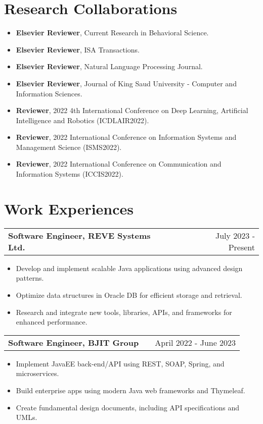 \documentclass[a4paper, 12pt]{article}
\makeatletter
\newenvironment{joblong}[2]{
\begin{tabularx}
	{\linewidth}{@{}l X r@{}} \textbf{#1} & \hfill & #2 \\[3.75pt]
\end{tabularx}
\begin{minipage}[t]{\linewidth} \begin{itemize}[nosep,after=\strut, leftmargin=1em,
itemsep=3pt,label=\textbullet] }{ \end{itemize} \end{minipage} }
\makeatother
\begin{document}
	\section{\textbf{Research Collaborations}}

	\begin{itemize}[leftmargin=*,itemsep=2pt,parsep=0pt]
		\item \textbf{Elsevier Reviewer}, Current Research in Behavioral Science.

		\item \textbf{Elsevier Reviewer}, ISA Transactions.

		\item \textbf{Elsevier Reviewer}, Natural Language Processing Journal.

		\item \textbf{Elsevier Reviewer}, Journal of King Saud University - Computer
			and Information Sciences.

		\item \textbf{Reviewer}, 2022 4th International Conference on Deep Learning,
			Artificial Intelligence and Robotics (ICDLAIR2022).

		\item \textbf{Reviewer}, 2022 International Conference on Information Systems
			and Management Science (ISMS2022).

		\item \textbf{Reviewer}, 2022 International Conference on Communication and Information
			Systems (ICCIS2022).
	\end{itemize}

	\section{\textbf{Work Experiences}}

	\begin{joblong}
		{Software Engineer, REVE Systems Ltd.}{July 2023 - Present} \item Develop
		and implement scalable Java applications using advanced design patterns. \item
		Optimize data structures in Oracle DB for efficient storage and retrieval.
		\item Research and integrate new tools, libraries, APIs, and frameworks for enhanced
		performance.
	\end{joblong}

	\begin{joblong}
		{Software Engineer, BJIT Group}{April 2022 - June 2023} \item Implement
		JavaEE back-end/API using REST, SOAP, Spring, and microservices. \item Build
		enterprise apps using modern Java web frameworks and Thymeleaf. \item Create
		fundamental design documents, including API specifications and UMLs.
	\end{joblong}
\end{document}
